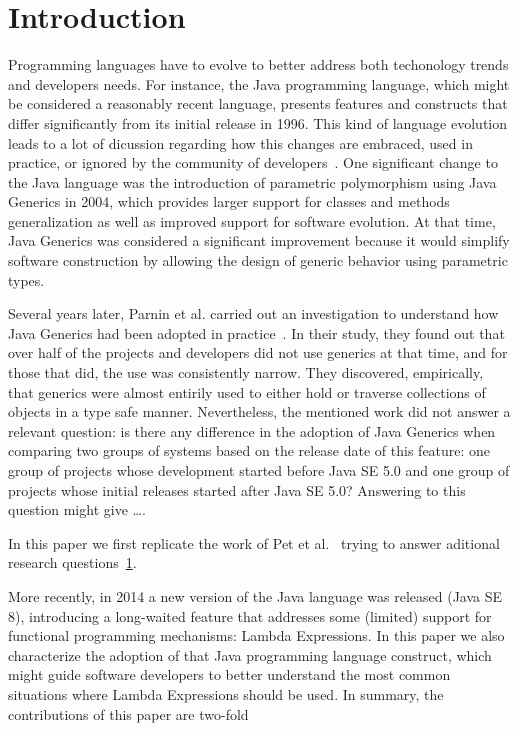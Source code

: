 \documentclass{sig-alternate-05-2015}
\begin{document}


\section{Introduction}
Programming languages have to evolve to better address both techonology 
trends and developers needs. For instance, the Java programming language, which might be 
considered a reasonably recent language, presents features and constructs that 
differ significantly from its initial release in 1996. This kind of 
language evolution leads to a lot of dicussion regarding 
how this changes are embraced, used in practice, or ignored by the community of 
developers~\cite{}. One significant change to the Java language was 
the introduction of parametric polymorphism using Java Generics in 2004, which 
provides larger support for classes and methods generalization as well as 
improved support for software evolution. At that time, Java Generics 
was considered a significant improvement because it would simplify 
software construction by allowing the design of generic behavior using 
parametric types.

Several years later, Parnin et al. carried out an investigation to understand 
how Java Generics had been adopted in practice~\cite{}. 
In their study, they found out that over half of the projects and developers did not use generics at that time, and for those that did, the use was consistently narrow. They discovered, empirically, that generics were almost entirily used to either hold or traverse collections of objects in a type safe manner. 
Nevertheless, the mentioned work did not answer a relevant question: is there 
any difference in the adoption of Java Generics when comparing two 
groups of systems based on the release date of this feature: one group of 
projects whose development started before Java SE 5.0 and one group of projects whose initial releases started after Java SE 5.0? 
{\color{red}Answering to this question might give \ldots}.

In this paper we first replicate the work of 
Pet et al.~\cite{} trying to answer aditional research questions~\ref{}. 

More recently, in 2014 a new version of the Java language was released (Java SE 8), introducing a long-waited feature that addresses some 
(limited) support for functional programming mechanisms: Lambda Expressions. In this paper we also characterize the adoption of that 
Java programming language construct, which might guide software 
developers to better understand the most common situations 
where Lambda Expressions should be used. In summary, the contributions of this paper are two-fold
\end{document}
